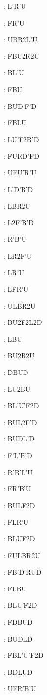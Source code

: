 \documentclass[9pt]{article}
\begin{document}
{\begin{multicols}{6}
: L'R'U

: FR'U

: UBR2L'U

: FBU2R2U

: BL'U

: FBU

: BUD'F'D

: FBLU

: LU'F2B'D

: FURD'FD

: UFU'R'U

: L'D'B'D

: LBR2U

: L2F'B'D

: R'B'U

: LR2F'U

: LR'U

: LFR'U

: ULBR2U

: BU2F2L2D

: LBU

: BU2B2U

: DBUD

: LU2BU

: BL'U'F2D

: BUL2F'D

: BUDL'D

: F'L'B'D

: R'B'L'U

: FR'B'U

: BULF2D

: FLR'U

: BLUF2D

: FULBR2U

: FB'D'RUD

: FLBU

: BLU'F2D

: FDBUD

: BUDLD

: FBL'U'F2D

: BDLUD

: UFR'B'U


\end{multicols}}
\end{document}
